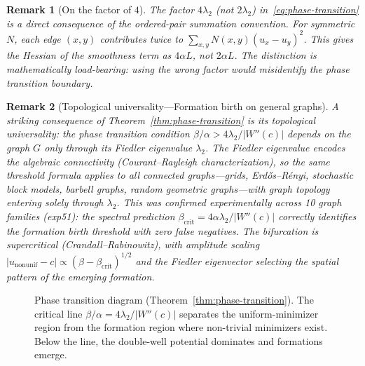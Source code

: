 \documentclass[lettersize,journal]{IEEEtran}
\newtheorem{remark}{Remark}
\begin{document}
\begin{remark}[On the factor of $4$]
The factor $4\lambda_2$ (not $2\lambda_2$) in~\eqref{eq:phase-transition} is a direct consequence of the ordered-pair summation convention. For symmetric $N$, each edge $(x,y)$ contributes twice to $\sum_{x,y} N(x,y)(u_x - u_y)^2$. This gives the Hessian of the smoothness term as $4\alpha L$, not $2\alpha L$. The distinction is mathematically load-bearing: using the wrong factor would misidentify the phase transition boundary.
\end{remark}

\begin{remark}[Topological universality---Formation birth on general graphs]
\label{rmk:formation-birth}
A striking consequence of Theorem~\ref{thm:phase-transition} is its \emph{topological universality}: the phase transition condition $\beta/\alpha > 4\lambda_2/|W''(c)|$ depends on the graph $G$ \emph{only} through its Fiedler eigenvalue $\lambda_2$. The Fiedler eigenvalue encodes the algebraic connectivity (Courant--Rayleigh characterization), so the same threshold formula applies to \emph{all} connected graphs---grids, Erd\H{o}s--R\'enyi, stochastic block models, barbell graphs, random geometric graphs---with graph topology entering solely through $\lambda_2$. This was confirmed experimentally across 10 graph families (exp51): the spectral prediction $\beta_{\mathrm{crit}} = 4\alpha\lambda_2/|W''(c)|$ correctly identifies the formation birth threshold with zero false negatives. The bifurcation is supercritical (Crandall--Rabinowitz), with amplitude scaling $|u_{\mathrm{nonunif}} - c| \propto (\beta - \beta_{\mathrm{crit}})^{1/2}$ and the Fiedler eigenvector selecting the spatial pattern of the emerging formation.
\end{remark}

\begin{figure}[!t]
\centering
{}
\caption{Phase transition diagram (Theorem~\ref{thm:phase-transition}). The critical line $\beta/\alpha = 4\lambda_2/|W''(c)|$ separates the uniform-minimizer region from the formation region where non-trivial minimizers exist. Below the line, the double-well potential dominates and formations emerge.}
\label{fig:phase-transition}
\end{figure}
\end{document}
